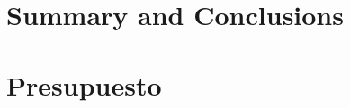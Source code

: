 \documentclass[spanish,a4paper,12pt,oneside]{extreport}
\begin{document}


\newpage{\pagestyle{empty}}
\thispagestyle{empty}

\chapter{\LARGE Summary and Conclusions}
\label{chapter:Conclusiones}



\newpage{\pagestyle{empty}}
\thispagestyle{empty}

\chapter{\LARGE Presupuesto}
\label{chapter:presupuesto}





% 

% 

\end{document}
